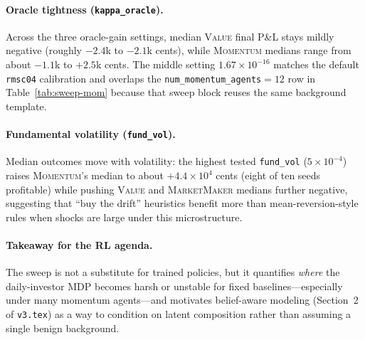 \documentclass[11pt]{article}
\begin{document}
\paragraph{Oracle tightness (\texttt{kappa\_oracle}).}
Across the three oracle-gain settings, median \textsc{Value} final P\&L stays mildly negative (roughly
$-2.4$k to $-2.1$k cents), while \textsc{Momentum} medians range from about $-1.1$k to $+2.5$k cents. The
middle setting $1.67\times 10^{-16}$ matches the default \texttt{rmsc04} calibration and overlaps the
\texttt{num\_momentum\_agents}${}=12$ row in Table~\ref{tab:sweep-mom} because that sweep block reuses the
same background template.

\paragraph{Fundamental volatility (\texttt{fund\_vol}).}
Median outcomes move with volatility: the highest tested \texttt{fund\_vol} ($5\times 10^{-4}$) raises
\textsc{Momentum}'s median to about $+4.4\times 10^{4}$ cents (eight of ten seeds profitable) while pushing
\textsc{Value} and \textsc{MarketMaker} medians further negative, suggesting that ``buy the drift'' heuristics
benefit more than mean-reversion-style rules when shocks are large under this microstructure.

\paragraph{Takeaway for the RL agenda.}
The sweep is not a substitute for trained policies, but it quantifies \emph{where} the daily-investor MDP
becomes harsh or unstable for fixed baselines---especially under many momentum agents---and motivates
belief-aware modeling (Section~2 of \texttt{v3.tex}) as a way to condition on latent composition rather than
assuming a single benign background.
\end{document}
